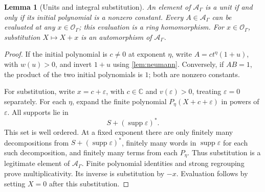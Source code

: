 \documentclass[11pt]{article}
\theoremstyle{plain}
\newtheorem{lemma}[lemma]{Lemma}
\theoremstyle{plain}
\theoremstyle{plain}
\theoremstyle{definition}
\theoremstyle{definition}
\theoremstyle{definition}
\theoremstyle{remark}
\newcommand{\C}{\mathbb C}\newcommand{\R}{\mathbb R}
\newcommand{\A}{\mathcal A_\Gamma}\newcommand{\OO}{\mathcal O_\Gamma}
\DeclareMathOperator{\supp}{supp}\DeclareMathOperator{\lc}{lc}
\begin{document}
\begin{lemma}[Units and integral substitution]\label{lem:A-units}
An element of $\A$ is a unit if and only if its initial polynomial is
a nonzero constant. Every $A\in\A$ can be evaluated at any $x\in\OO$;
this evaluation is a ring homomorphism. For $x\in\OO$, substitution
$X\mapsto X+x$ is an automorphism of $\A$.
\end{lemma}
\begin{proof}
If the initial polynomial is $c\ne0$ at exponent $\eta$, write
$A=ct^\eta(1+u)$, with $w(u)>0$, and invert $1+u$ using
\cref{lem:neumann}. Conversely, if $AB=1$, the product of the two
initial polynomials is $1$; both are nonzero constants.

For substitution, write $x=c+\varepsilon$, with $c\in\C$ and
$v(\varepsilon)>0$, treating $\varepsilon=0$ separately. For each
$\eta$, expand the finite polynomial $P_\eta(X+c+\varepsilon)$ in
powers of $\varepsilon$. All supports lie in
\[
 S+(\supp\varepsilon)^*.
\]
This set is well ordered. At a fixed exponent there are only finitely
many decompositions from $S+(\supp\varepsilon)^*$, finitely many words
in $\supp\varepsilon$ for each such decomposition, and finitely many
terms from each $P_\eta$. Thus substitution is a legitimate element
of $\A$. Finite polynomial identities and strong regrouping prove
multiplicativity. Its inverse is substitution by $-x$.
Evaluation follows by setting $X=0$ after this substitution.
\end{proof}
\end{document}
